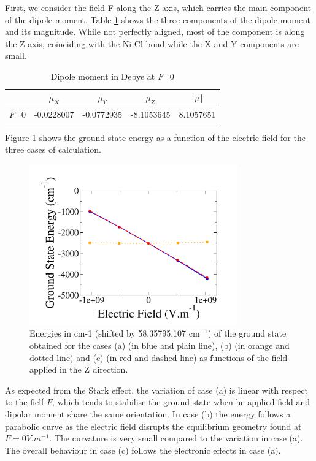 \documentclass[10pt]{report}
\numberwithin{equation}{section}
\begin{document}
First, we consider the field F along the Z axis, which carries the main component of the dipole moment.
Table \ref{tab:DipF0Z} shows the three components of the dipole moment and its magnitude. While not perfectly aligned, most of the component is along the Z axis, coinciding with the Ni-Cl bond while the X and Y components are small.

\begin{table}[h]
    \centering
    \begin{tabular}{|c | c c c | c|}
        \hline
        & $\mu_X$ & $\mu_Y$ & $\mu_Z$ & |$\vb \mu$|\\
        \hline
        $F$=0 & -0.0228007 & -0.0772935 & -8.1053645 & 8.1057651   \\
        \hline
    \end{tabular}
    \caption{Dipole moment in Debye at $F$=0}
    \label{tab:DipF0Z}
\end{table}

Figure \ref{GSE_Z} shows the ground state energy as a function of the electric field for the three cases of calculation.

\begin{figure}[!h]
    \centering
    \includegraphics[width=0.8\textwidth]{Images/E_Z_grand.png}
    \caption{Energies in cm-1 (shifted by 58.35795.107 cm$^{-1}$) of the ground state obtained for the cases (a) (in blue and plain line), (b)
    (in orange and dotted line) and (c) (in red and dashed line) as functions of the field applied in the Z direction.}
    \label{GSE_Z}
\end{figure}
As expected from the Stark effect, the variation of case (a) is linear with respect to the fielf $F$, which tends to stabilise the ground state when he applied field and dipolar moment share the same orientation.
In case (b) the energy follows a parabolic curve as the electric field disrupts the equilibrium geometry found at $F=0V.m^{-1}$. 
The curvature is very small compared to the variation in case (a). The overall behaviour in case (c) follows the electronic effects in case (a).
\end{document}
